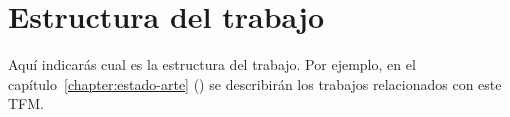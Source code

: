 \section{Estructura del trabajo}\label{section:estructura}

Aquí indicarás cual es la estructura del trabajo. Por ejemplo, en el capítulo~\ref{chapter:estado-arte} () se describirán los trabajos relacionados con este TFM.
